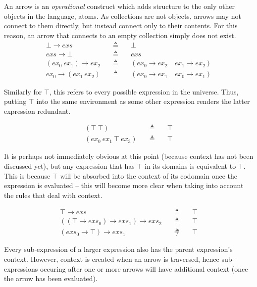 \documentclass[a4paper,11pt]{article}
\begin{document}
An arrow is an \emph{operational} construct which adds structure to the only other objects in the language, atoms.
As collections are not objects, arrows may not connect to them directly, but instead connect only to their contents.
For this reason, an arrow that connects to an empty collection simply does not exist.
\begin{eqnarray*}
\bot \rightarrow exs \quad&\triangleq&\quad \bot \\
exs \rightarrow \bot \quad&\triangleq&\quad exs \\
(ex_0\ ex_1) \rightarrow ex_2 \quad&\triangleq&\quad (ex_0 \rightarrow ex_2 \quad ex_1 \rightarrow ex_2) \\
ex_0 \rightarrow (ex_1\ ex_2) \quad&\triangleq&\quad (ex_0 \rightarrow ex_1 \quad ex_0 \rightarrow ex_1)
\end{eqnarray*}

Similarly for $\top$, this refers to every possible expression in the universe.
Thus, putting $\top$ into the same environment as some other expression renders the latter expression redundant.

\begin{eqnarray*}
(\top\ \top) \quad&\triangleq&\quad \top \\
(ex_0\ ex_1\ \top\ ex_3) \quad&\triangleq&\quad \top
\end{eqnarray*}

It is perhaps not immediately obvious at this point (because context has not been discussed yet), but any expression that has $\top$ in its domains is equivalent to $\top$.
This is because $\top$ will be absorbed into the context of its codomain once the expression is evaluated -- this will become more clear when taking into account the rules that deal with context.

\begin{eqnarray*}
\top \rightarrow exs \quad&\triangleq&\quad \top \\
((\top \rightarrow exs_0) \rightarrow exs_1) \rightarrow exs_2 \quad&\triangleq&\quad \top \\
(exs_0 \rightarrow \top) \rightarrow exs_1 \quad&\not\triangleq&\quad \top
\end{eqnarray*}

Every sub-expression of a larger expression also has the parent expression's context.
However, context is created when an arrow is traversed, hence sub-expressions occuring after one or more arrows will have additional context (once the arrow has been evaluated).
\end{document}
